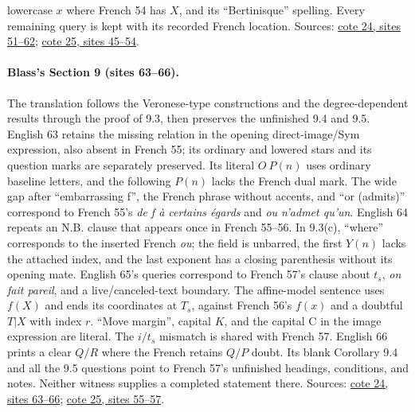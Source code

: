 lowercase $x$ where French 54 has $X$, and its ``Bertinisque'' spelling. Every remaining query is kept with its recorded French location. Sources: \href{https://grothendieck.umontpellier.fr/web/viewer.html?file=../24.pdf\#page=52}{cote 24, sites 51--62}; \href{https://grothendieck.umontpellier.fr/web/viewer.html?file=../25.pdf\#page=46}{cote 25, sites 45--54}.

\paragraph{Blass's Section 9 (sites 63--66).}
The translation follows the Veronese-type constructions and the degree-dependent results through the proof of 9.3, then preserves the unfinished 9.4 and 9.5. English 63 retains the missing relation in the opening direct-image/Sym expression, also absent in French 55; its ordinary and lowered stars and its question marks are separately preserved. Its literal $O\ P(n)$ uses ordinary baseline letters, and the following $P(n)$ lacks the French dual mark. The wide gap after ``embarrassing f'', the French phrase without accents, and ``or (admits)'' correspond to French 55's \emph{de f à certains égards} and \emph{ou n'admet qu'un}. English 64 repeats an N.B. clause that appears once in French 55--56. In 9.3(c), ``where'' corresponds to the inserted French \emph{ou}; the field is unbarred, the first $Y(n)$ lacks the attached index, and the last exponent has a closing parenthesis without its opening mate. English 65's queries correspond to French 57's clause about $t_s$, \emph{on fait pareil}, and a live/canceled-text boundary. The affine-model sentence uses $f(X)$ and ends its coordinates at $T_s$, against French 56's $f(x)$ and a doubtful $T|X$ with index $r$. ``Move margin'', capital $K$, and the capital C in the image expression are literal. The $i/t_s$ mismatch is shared with French 57. English 66 prints a clear $Q/R$ where the French retains $Q/P$ doubt. Its blank Corollary 9.4 and all the 9.5 questions point to French 57's unfinished headings, conditions, and notes. Neither witness supplies a completed statement there. Sources: \href{https://grothendieck.umontpellier.fr/web/viewer.html?file=../24.pdf\#page=64}{cote 24, sites 63--66}; \href{https://grothendieck.umontpellier.fr/web/viewer.html?file=../25.pdf\#page=56}{cote 25, sites 55--57}.

